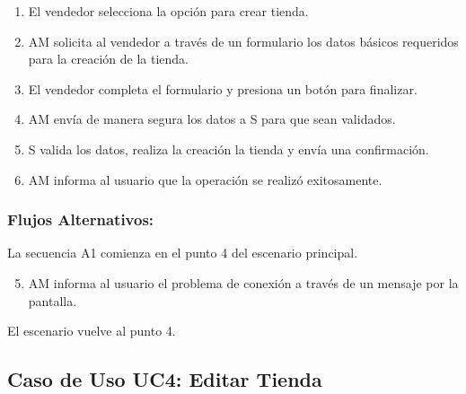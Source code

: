 \begin{framed}
\begin{enumerate}
    \item El vendedor selecciona la opción para crear tienda. 
    \item AM solicita al vendedor a través de un formulario los datos básicos requeridos para la creación de la tienda.
    \item El vendedor completa el formulario y presiona un botón para finalizar.
    \item AM envía de manera segura los datos a S para que sean validados.
    \item S valida los datos, realiza la creación la tienda y envía una confirmación.
    \item AM informa al usuario que la operación se realizó exitosamente.
\end{enumerate}

\subsubsection{Flujos Alternativos: }

La secuencia A1 comienza en el punto 4 del escenario principal. 
\begin{enumerate}
    \setcounter{enumi}{4}
    \item AM informa al usuario el problema de conexión a través de un mensaje por la pantalla.
\end{enumerate}
El escenario vuelve al punto 4.

\end{framed}



\subsection{Caso de Uso UC4: Editar Tienda}

